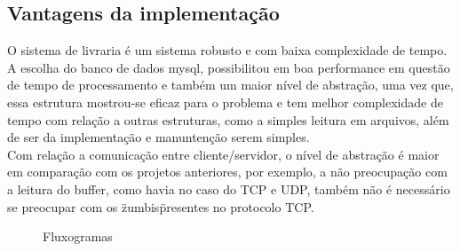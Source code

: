 \documentclass[a4paper,10pt]{article}
\begin{document}
\subsection{Vantagens da implementação}
O sistema de livraria é um sistema robusto e com baixa complexidade de tempo.
A escolha do banco de dados mysql, possibilitou em boa 
performance em questão de tempo de processamento e também um maior nível de abstração, uma vez que, essa estrutura
mostrou-se eficaz para o problema e tem melhor complexidade de tempo com 
relação a outras estruturas, como a simples leitura em arquivos, além de ser da implementação e manuntenção serem
simples.
\\ Com relação a comunicação entre cliente/servidor, o nível de abstração é maior em comparação com os projetos anteriores, por exemplo, a não preocupação com a 
leitura do buffer, como havia no caso do TCP e UDP, também não é necessário se preocupar com os \"zumbis\" presentes no protocolo TCP.
\newpage
\begin{figure}[!htb]
  \centering
  \quad %
   \caption{Fluxogramas}
   \label{figfluxos}
\end{figure}
\end{document}

